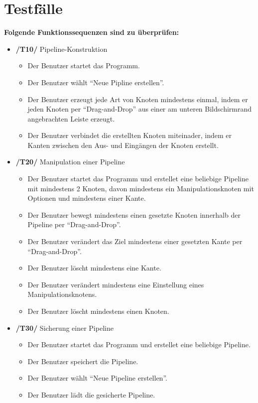 \section{Testfälle}

\textbf{Folgende Funktionssequenzen sind zu überprüfen:}
\begin{itemize}
	\item\textbf{/T10/} Pipeline-Konstruktion
		\begin{itemize}
			\item Der Benutzer startet das Programm.
			\item Der Benutzer wählt ``Neue Pipline erstellen''.
			\item Der Benutzer erzeugt jede Art von Knoten mindestens einmal, indem er jeden Knoten per ``Drag-and-Drop'' aus einer am unteren Bildschirmrand
				angebrachten Leiste erzeugt.
			\item Der Benutzer verbindet die erstellten Knoten miteinader, indem er Kanten zwischen den Aus- und Eingängen der Knoten erstellt.
		\end{itemize}
	\item\textbf{/T20/} Manipulation einer Pipeline
		\begin{itemize}
			\item Der Benutzer startet das Programm und erstellet eine beliebige Pipeline mit mindestens 2 Knoten, davon mindestens ein Manipulationsknoten mit Optionen 
				und mindestens einer Kante.
			\item Der Benutzer bewegt mindestens einen gesetzte Knoten innerhalb der Pipeline per ``Drag-and-Drop''.
			\item Der Benutzer verändert das Ziel mindestens einer gesetzten Kante per ``Drag-and-Drop''.
			\item Der Benutzer löscht mindestens eine Kante.
			\item Der Benutzer verändert mindestens eine Einstellung eines Manipulationsknotens.
			\item Der Benutzer löscht mindestens einen Knoten.
		\end{itemize}
	\item\textbf{/T30/} Sicherung einer Pipeline
		\begin{itemize}
			\item Der Benutzer startet das Programm und erstellet eine beliebige Pipeline.
			\item Der Benutzer speichert die Pipeline.
			\item Der Benutzer wählt ``Neue Pipeline erstellen''.
			\item Der Benutzer lädt die gesicherte Pipeline.

\end{itemize}
\end{itemize}
